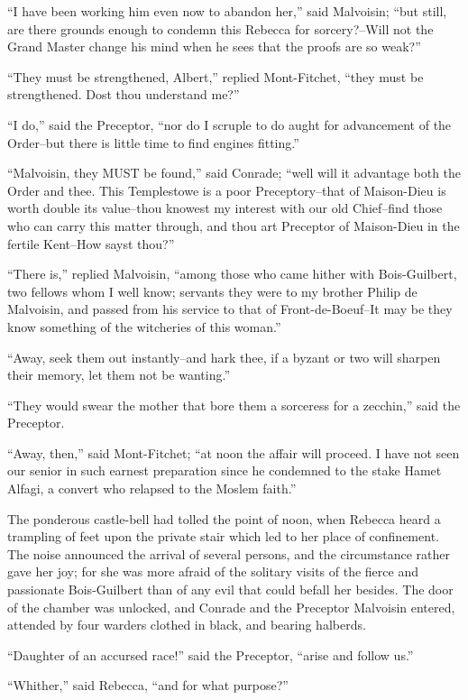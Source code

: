 ``I have been working him even now to abandon her,'' said Malvoisin;
``but still, are there grounds enough to condemn this Rebecca for
sorcery?--Will not the Grand Master change his mind when he sees that
the proofs are so weak?''

``They must be strengthened, Albert,'' replied Mont-Fitchet, ``they must
be strengthened. Dost thou understand me?''

``I do,'' said the Preceptor, ``nor do I scruple to do aught for
advancement of the Order--but there is little time to find engines
fitting.''

``Malvoisin, they MUST be found,'' said Conrade; ``well will it
advantage both the Order and thee. This Templestowe is a poor
Preceptory--that of Maison-Dieu is worth double its value--thou knowest
my interest with our old Chief--find those who can carry this matter
through, and thou art Preceptor of Maison-Dieu in the fertile Kent--How
sayst thou?''

``There is,'' replied Malvoisin, ``among those who came hither with
Bois-Guilbert, two fellows whom I well know; servants they were to my
brother Philip de Malvoisin, and passed from his service to that of
Front-de-Boeuf--It may be they know something of the witcheries of this
woman.''

``Away, seek them out instantly--and hark thee, if a byzant or two will
sharpen their memory, let them not be wanting.''

``They would swear the mother that bore them a sorceress for a
zecchin,'' said the Preceptor.

``Away, then,'' said Mont-Fitchet; ``at noon the affair will proceed. I
have not seen our senior in such earnest preparation since he condemned
to the stake Hamet Alfagi, a convert who relapsed to the Moslem faith.''

The ponderous castle-bell had tolled the point of noon, when Rebecca
heard a trampling of feet upon the private stair which led to her place
of confinement. The noise announced the arrival of several persons, and
the circumstance rather gave her joy; for she was more afraid of the
solitary visits of the fierce and passionate Bois-Guilbert than of any
evil that could befall her besides. The door of the chamber was
unlocked, and Conrade and the Preceptor Malvoisin entered, attended by
four warders clothed in black, and bearing halberds.

``Daughter of an accursed race!'' said the Preceptor, ``arise and follow
us.''

``Whither,'' said Rebecca, ``and for what purpose?''

